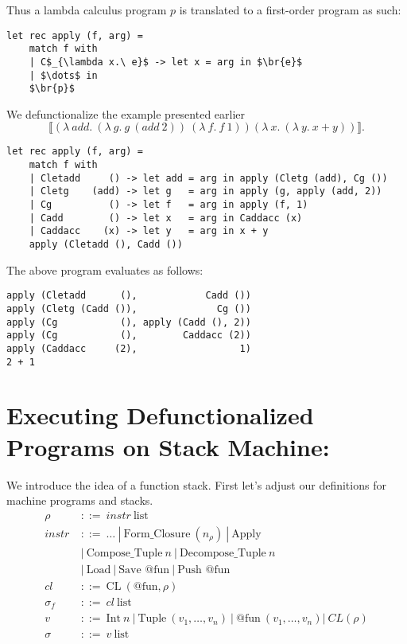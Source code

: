 \documentclass[11pt]{article}
\newcommand*{\br}[1]{\llbracket{#1}\rrbracket}
\begin{document}
Thus a lambda calculus program $p$ is translated to a first-order program as such:
\begin{lstlisting}[mathescape = true]
let rec apply (f, arg) = 
    match f with
    | C$_{\lambda x.\ e}$ -> let x = arg in $\br{e}$
    | $\dots$ in
    $\br{p}$
\end{lstlisting}

We defunctionalize the example presented earlier $$\br{(\lambda\ add.\ (\lambda\ g.\ g\ (add\ 2))\ (\lambda\ f.\ f\ 1)) (\lambda\ x.\ (\lambda\ y.\ x + y))}.$$
\begin{lstlisting}[mathescape = true]
let rec apply (f, arg) = 
    match f with
    | Cletadd     () -> let add = arg in apply (Cletg (add), Cg ())
    | Cletg    (add) -> let g   = arg in apply (g, apply (add, 2))
    | Cg          () -> let f   = arg in apply (f, 1)
    | Cadd        () -> let x   = arg in Caddacc (x)
    | Caddacc    (x) -> let y   = arg in x + y
    apply (Cletadd (), Cadd ())
\end{lstlisting}

The above program evaluates as follows:
\begin{lstlisting}
apply (Cletadd      (),            Cadd ())
apply (Cletg (Cadd ()),              Cg ())
apply (Cg           (), apply (Cadd (), 2))
apply (Cg           (),        Caddacc (2))
apply (Caddacc     (2),                  1)
2 + 1
\end{lstlisting}

\section*{Executing Defunctionalized Programs on Stack Machine:}

We introduce the idea of a function stack. First let's adjust our definitions for machine programs and stacks.
\begin{align*}
    \rho &::=\ instr\ \text{list}\\
    instr\ &::=\ \dots\ |\ \text{Form\_Closure}\ (n_{\rho})\ |\ \text{Apply}\\
    & |\ \text{Compose\_Tuple}\ n\ |\ \text{Decompose\_Tuple}\ n\\
    & |\ \text{Load}\ |\ \text{Save @fun}\ |\ \text{Push @fun}\\
    cl &::=\ \text{CL}\ (\text{@fun}, \rho)\\
    \sigma_f &::=\ cl\ \text{list}\\
    v\ &::=\ \text {Int}\ n\ |\ \text{Tuple}\ (v_1, \dots, v_n)\ |\ \text{@fun}\ (v_1, \dots, v_n) |\ CL (\rho) \\
    \sigma &::=\ v\ \text{list}
\end{align*}
\end{document}
